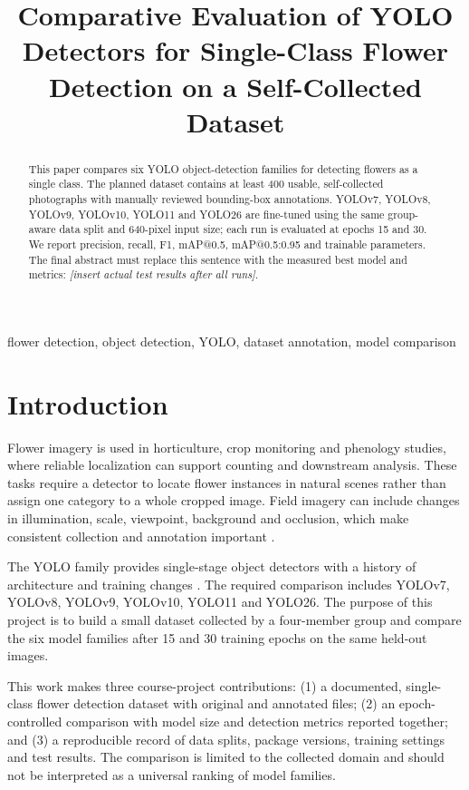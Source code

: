 \documentclass[conference]{IEEEtran}
\title{Comparative Evaluation of YOLO Detectors for Single-Class Flower Detection on a Self-Collected Dataset}
\author{
\IEEEauthorblockN{Member 1, Member 2, Member 3, Member 4}
\IEEEauthorblockA{Department / University\\
Email: replace-with-group-contact}
}
\begin{document}
\maketitle

\begin{abstract}
This paper compares six YOLO object-detection families for detecting flowers as a single class. The planned dataset contains at least 400 usable, self-collected photographs with manually reviewed bounding-box annotations. YOLOv7, YOLOv8, YOLOv9, YOLOv10, YOLO11 and YOLO26 are fine-tuned using the same group-aware data split and 640-pixel input size; each run is evaluated at epochs 15 and 30. We report precision, recall, F1, mAP@0.5, mAP@0.5:0.95 and trainable parameters. The final abstract must replace this sentence with the measured best model and metrics: \emph{[insert actual test results after all runs]}.
\end{abstract}

\begin{IEEEkeywords}
flower detection, object detection, YOLO, dataset annotation, model comparison
\end{IEEEkeywords}

\section{Introduction}
Flower imagery is used in horticulture, crop monitoring and phenology studies, where reliable localization can support counting and downstream analysis. These tasks require a detector to locate flower instances in natural scenes rather than assign one category to a whole cropped image. Field imagery can include changes in illumination, scale, viewpoint, background and occlusion, which make consistent collection and annotation important \cite{jiang2020deepflower,yu2024ynu}.

The YOLO family provides single-stage object detectors with a history of architecture and training changes \cite{redmon2016yolo,wang2022yolov7,wang2024yolov9,wang2024yolov10}. The required comparison includes YOLOv7, YOLOv8, YOLOv9, YOLOv10, YOLO11 and YOLO26. The purpose of this project is to build a small dataset collected by a four-member group and compare the six model families after 15 and 30 training epochs on the same held-out images.

This work makes three course-project contributions: (1) a documented, single-class flower detection dataset with original and annotated files; (2) an epoch-controlled comparison with model size and detection metrics reported together; and (3) a reproducible record of data splits, package versions, training settings and test results. The comparison is limited to the collected domain and should not be interpreted as a universal ranking of model families.
\end{document}
